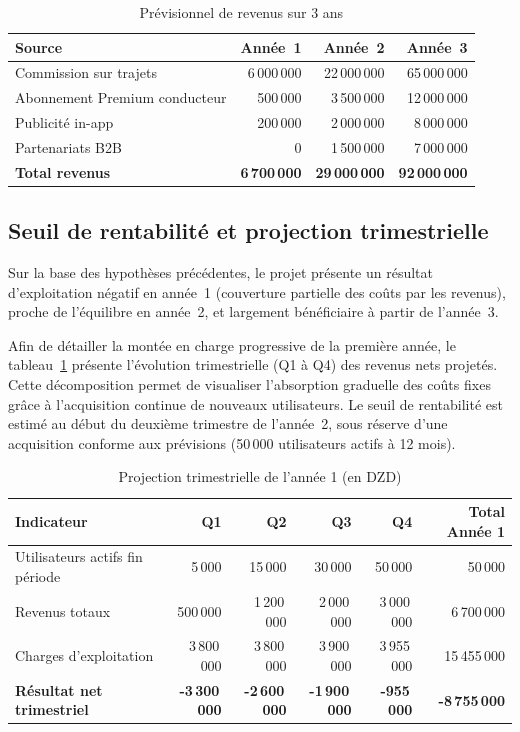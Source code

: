 \documentclass[12pt, a4paper, oneside]{report}
\begin{document}
\begin{table}[H]
\centering
\begin{tabularx}{\textwidth}{|X|r|r|r|}
\hline
\rowcolor{rohlight}
\textbf{Source} & \textbf{Année~1} & \textbf{Année~2} & \textbf{Année~3} \\
\hline
Commission sur trajets & 6\,000\,000 & 22\,000\,000 & 65\,000\,000 \\
\hline
Abonnement Premium conducteur & 500\,000 & 3\,500\,000 & 12\,000\,000 \\
\hline
Publicité in-app & 200\,000 & 2\,000\,000 & 8\,000\,000 \\
\hline
Partenariats B2B & 0 & 1\,500\,000 & 7\,000\,000 \\
\hline
\rowcolor{rohlight}
\textbf{Total revenus} & \textbf{6\,700\,000} & \textbf{29\,000\,000} & \textbf{92\,000\,000} \\
\hline
\end{tabularx}
  \caption{Prévisionnel de revenus sur 3 ans}
\end{table}

\subsection{Seuil de rentabilité et projection trimestrielle}

Sur la base des hypothèses précédentes, le projet présente un résultat d'exploitation négatif en année~1 (couverture partielle des coûts par les revenus), proche de l'équilibre en année~2, et largement bénéficiaire à partir de l'année~3. 

Afin de détailler la montée en charge progressive de la première année, le tableau~\ref{tab:trimestriel} présente l'évolution trimestrielle (Q1 à Q4) des revenus nets projetés. Cette décomposition permet de visualiser l'absorption graduelle des coûts fixes grâce à l'acquisition continue de nouveaux utilisateurs. Le seuil de rentabilité est estimé au début du deuxième trimestre de l'année~2, sous réserve d'une acquisition conforme aux prévisions (50\,000 utilisateurs actifs à 12 mois).

\begin{table}[H]
\centering
\footnotesize
\begin{tabularx}{\textwidth}{|X|r|r|r|r|r|}
\hline
\rowcolor{rohlight}
\textbf{Indicateur} & \textbf{Q1} & \textbf{Q2} & \textbf{Q3} & \textbf{Q4} & \textbf{Total Année 1} \\
\hline
Utilisateurs actifs fin période & 5\,000 & 15\,000 & 30\,000 & 50\,000 & 50\,000 \\
\hline
Revenus totaux & 500\,000 & 1\,200\,000 & 2\,000\,000 & 3\,000\,000 & 6\,700\,000 \\
\hline
Charges d'exploitation & 3\,800\,000 & 3\,800\,000 & 3\,900\,000 & 3\,955\,000 & 15\,455\,000 \\
\hline
\rowcolor{rohlight!20}
\textbf{Résultat net trimestriel} & \textbf{-3\,300\,000} & \textbf{-2\,600\,000} & \textbf{-1\,900\,000} & \textbf{-955\,000} & \textbf{-8\,755\,000} \\
\hline
\end{tabularx}
  \caption{Projection trimestrielle de l'année 1 (en DZD)}
  \label{tab:trimestriel}
\end{table}
\end{document}
